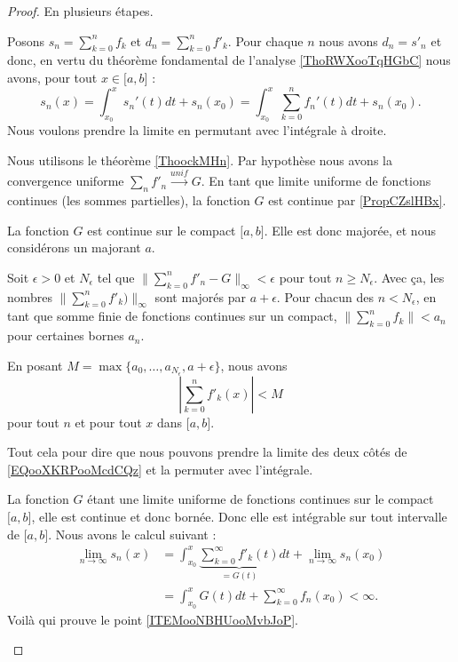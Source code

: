 \begin{proof}
	En plusieurs étapes.
	\begin{subproof}
		Posons \( s_n=\sum_{k=0}^nf_k\) et \( d_n=\sum_{k=0}^nf'_k\). Pour chaque \( n\) nous avons \( d_n=s'_n\) et donc, en vertu du théorème fondamental de l'analyse \ref{ThoRWXooTqHGbC} nous avons, pour tout \( x\in \mathopen[ a,b\mathclose]\) :
		\begin{equation}		\label{EQooXKRPooMcdCQz}
			s_n(x)=\int_{x_0}^xs_n'(t)dt+s_n(x_0)=\int_{x_0}^x\sum_{k=0}^nf_n'(t)dt+s_n(x_0).
		\end{equation}
		Nous voulons prendre la limite en permutant avec l'intégrale à droite.


		Nous utilisons le théorème \ref{ThoockMHn}. Par hypothèse nous avons la convergence uniforme \( \sum_nf'_n\stackrel{ unif}{\longrightarrow} G\). En tant que limite uniforme de fonctions continues (les sommes partielles), la fonction \( G\) est continue par \ref{PropCZslHBx}.

		La fonction \( G\) est continue sur le compact \( \mathopen[ a,b\mathclose]\). Elle est donc majorée, et nous considérons un majorant \( a\).

		Soit \( \epsilon>0\) et \( N_{\epsilon}\) tel que \( \| \sum_{k=0}^nf'_n-G \|_{\infty}<\epsilon\) pour tout \( n\geq N_{\epsilon}\). Avec ça, les nombres \(  \| \sum_{k=0}^nf'_k) \|_{\infty}\) sont majorés par \( a+\epsilon\). Pour chacun des \( n<N_{\epsilon}\), en tant que somme finie de fonctions continues sur un compact, \( \| \sum_{k=0}^nf_k \|<a_n\) pour certaines bornes \( a_n\).

		En posant \( M=\max\{ a_0,\ldots,a_{N_{\epsilon}}, a+\epsilon \}\), nous avons
		\begin{equation}
			| \sum_{k=0}^nf'_k(x) |<M
		\end{equation}
		pour tout \( n\) et pour tout \( x\) dans \( \mathopen[ a,b\mathclose]\).

		Tout cela pour dire que nous pouvons prendre la limite des deux côtés de \eqref{EQooXKRPooMcdCQz} et la permuter avec l'intégrale.

		\spitem[La limite]
		La fonction \( G\) étant une limite uniforme de fonctions continues sur le compact \( \mathopen[ a,b\mathclose]\), elle est continue et donc bornée. Donc elle est intégrable sur tout intervalle de \( \mathopen[ a,b\mathclose]\). Nous avons le calcul suivant :
		\begin{subequations}		\label{EQooZXHUooXgSDFo}
			\begin{align}
				\lim_{n\to \infty}s_n(x) & =\int_{x_0}^x\underbrace{\sum_{k=0}^{\infty}f'_k(t)}_{=G(t)}dt+\lim_{n\to \infty}s_n(x_0) \\
				                         & = \int_{x_0}^xG(t)dt+\sum_{k=0}^{\infty}f_n(x_0)<\infty.
			\end{align}
		\end{subequations}
		Voilà qui prouve le point \ref{ITEMooNBHUooMvbJoP}.


\end{subproof}
\end{proof}
